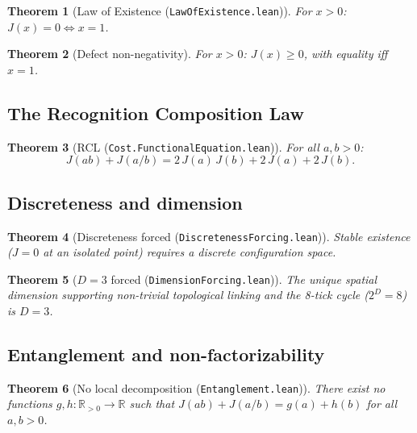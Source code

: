 \documentclass[11pt,a4paper]{article}
\theoremstyle{plain}
\newtheorem{theorem}{Theorem}[section]
\theoremstyle{definition}
\theoremstyle{remark}
\newcommand{\R}{\mathbb{R}}
\newcommand{\Rp}{\mathbb{R}_{>0}}
\newcommand{\Jcost}{J}
\begin{document}
\begin{theorem}[Law of Existence {\normalfont(\texttt{LawOfExistence.lean})}]
\label{thm:law-of-existence}
For $x > 0$: \;$\Jcost(x) = 0 \iff x = 1$.
\end{theorem}

\begin{theorem}[Defect non-negativity]
For $x > 0$: \;$\Jcost(x) \geq 0$, with equality iff $x = 1$.
\end{theorem}

\subsection{The Recognition Composition Law}

\begin{theorem}[RCL {\normalfont(\texttt{Cost.FunctionalEquation.lean})}]
\label{thm:rcl}
For all $a, b > 0$:
\[
  \Jcost(ab) + \Jcost(a/b) = 2\,\Jcost(a)\,\Jcost(b) + 2\,\Jcost(a) + 2\,\Jcost(b).
\]
\end{theorem}

\subsection{Discreteness and dimension}

\begin{theorem}[Discreteness forced {\normalfont(\texttt{DiscretenessForcing.lean})}]
Stable existence ($\Jcost = 0$ at an isolated point) requires a discrete
configuration space.
\end{theorem}

\begin{theorem}[$D = 3$ forced {\normalfont(\texttt{DimensionForcing.lean})}]
\label{thm:D3}
The unique spatial dimension supporting non-trivial topological linking
and the 8-tick cycle ($2^D = 8$) is $D = 3$.
\end{theorem}

\subsection{Entanglement and non-factorizability}

\begin{theorem}[No local decomposition {\normalfont(\texttt{Entanglement.lean})}]
\label{thm:no-local}
There exist no functions $g, h : \Rp \to \R$ such that
$\Jcost(ab) + \Jcost(a/b) = g(a) + h(b)$ for all $a, b > 0$.
\end{theorem}
\end{document}
